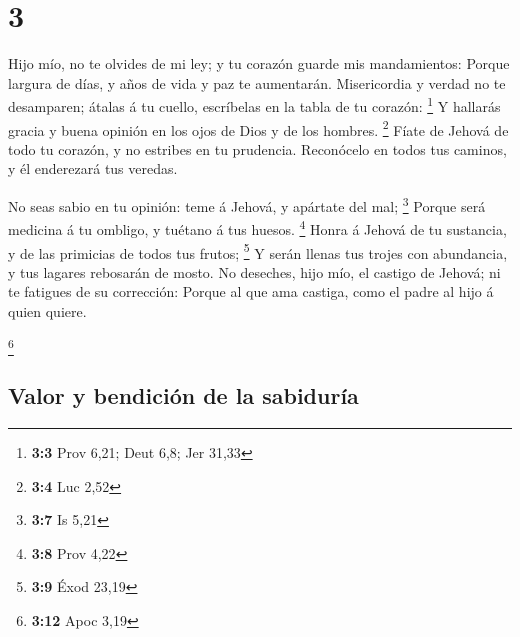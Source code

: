 \hypertarget{section-2}{%
\section{3}\label{section-2}}

 Hijo mío, no te olvides de mi ley; y tu corazón guarde mis
mandamientos:  Porque largura de días, y años de vida y paz
te aumentarán.  Misericordia y verdad no te desamparen;
átalas á tu cuello, escríbelas en la tabla de tu corazón: \footnote{\textbf{3:3}
  Prov 6,21; Deut 6,8; Jer 31,33}  Y hallarás gracia y buena
opinión en los ojos de Dios y de los hombres. \footnote{\textbf{3:4} Luc
  2,52}  Fíate de Jehová de todo tu corazón, y no estribes
en tu prudencia.  Reconócelo en todos tus caminos, y él
enderezará tus veredas.

 No seas sabio en tu opinión: teme á Jehová, y apártate del
mal; \footnote{\textbf{3:7} Is 5,21}  Porque será medicina á
tu ombligo, y tuétano á tus huesos. \footnote{\textbf{3:8} Prov 4,22}
 Honra á Jehová de tu sustancia, y de las primicias de todos
tus frutos; \footnote{\textbf{3:9} Éxod 23,19}  Y serán
llenas tus trojes con abundancia, y tus lagares rebosarán de mosto.
 No deseches, hijo mío, el castigo de Jehová; ni te
fatigues de su corrección:  Porque al que ama castiga, como
el padre al hijo á quien quiere.

\footnote{\textbf{3:12} Apoc 3,19}

\hypertarget{valor-y-bendiciuxf3n-de-la-sabiduruxeda}{%
\subsection{Valor y bendición de la
sabiduría}\label{valor-y-bendiciuxf3n-de-la-sabiduruxeda}}

